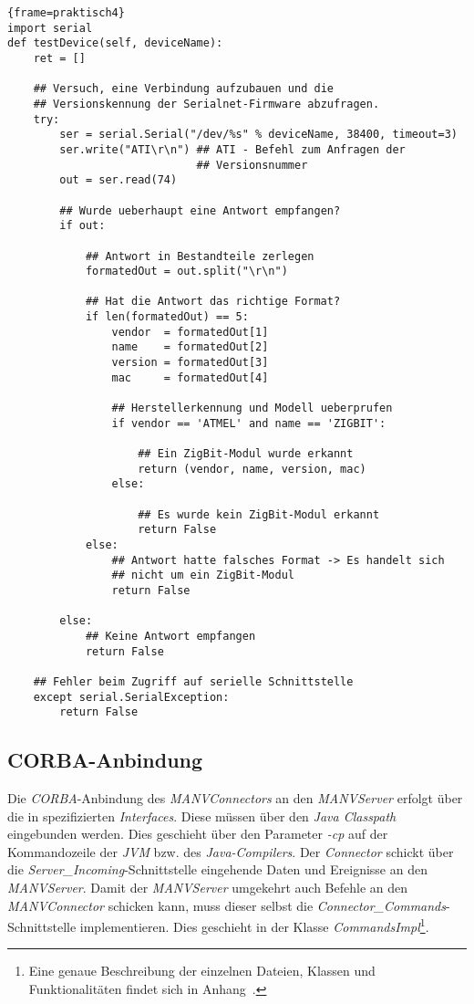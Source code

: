 \begin{lstlisting}{frame=praktisch4}
import serial
def testDevice(self, deviceName):
    ret = []

    ## Versuch, eine Verbindung aufzubauen und die 
    ## Versionskennung der Serialnet-Firmware abzufragen. 
    try:
        ser = serial.Serial("/dev/%s" % deviceName, 38400, timeout=3)
        ser.write("ATI\r\n") ## ATI - Befehl zum Anfragen der
                             ## Versionsnummer
        out = ser.read(74)
        
        ## Wurde ueberhaupt eine Antwort empfangen? 
        if out:

            ## Antwort in Bestandteile zerlegen
            formatedOut = out.split("\r\n")

            ## Hat die Antwort das richtige Format?
            if len(formatedOut) == 5:
                vendor  = formatedOut[1]
                name    = formatedOut[2]
                version = formatedOut[3]
                mac     = formatedOut[4]

                ## Herstellerkennung und Modell ueberprufen
                if vendor == 'ATMEL' and name == 'ZIGBIT':

                    ## Ein ZigBit-Modul wurde erkannt
                    return (vendor, name, version, mac)
                else:

                    ## Es wurde kein ZigBit-Modul erkannt
                    return False
            else:
                ## Antwort hatte falsches Format -> Es handelt sich
                ## nicht um ein ZigBit-Modul
                return False

        else:
            ## Keine Antwort empfangen
            return False

    ## Fehler beim Zugriff auf serielle Schnittstelle
    except serial.SerialException:
        return False
\end{lstlisting}

\subsection{CORBA-Anbindung}
Die \emph{CORBA}-Anbindung des \emph{MANVConnectors} an den \emph{MANVServer} erfolgt über
die in \cite{Jan} spezifizierten \emph{Interfaces}. Diese müssen über den \emph{Java Classpath}
eingebunden werden. Dies geschieht über den Parameter \emph{-cp} auf der Kommandozeile
der \emph{JVM} bzw. des \emph{Java-Compilers}. Der \emph{Connector} schickt über die 
\emph{Server\_Incoming}-Schnittstelle eingehende Daten und Ereignisse an den \emph{MANVServer}.
Damit der \emph{MANVServer} umgekehrt auch Befehle an den \emph{MANVConnector} schicken kann,
muss dieser selbst die \emph{Connector\_Commands}-Schnittstelle implementieren. Dies
geschieht in der Klasse \emph{CommandsImpl}\footnote{Eine
genaue Beschreibung der einzelnen Dateien, Klassen und Funktionalitäten findet sich in
Anhang~\label{anhang_beschreibung_software}.}.\\

